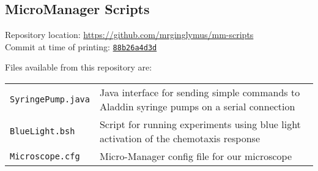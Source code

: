\documentclass[../main.tex]{subfiles}
\begin{document}
\subsection{MicroManager Scripts}
\label{sec:scripts:micromanager}

Repository location: \url{https://github.com/mrginglymus/mm-scripts}\\
Commit at time of printing: \href{https://github.com/mrginglymus/mm-scripts/tree/88b26a4d3db8fb4904cfaae76df14207a233072f}{\texttt{88b26a4d3d}}

Files available from this repository are:

\begin{tabular}{lp{12cm}}
\texttt{SyringePump.java}	&	Java interface for sending simple commands to Aladdin syringe pumps on a serial connection \\
\texttt{BlueLight.bsh}	&	Script for running experiments using blue light activation of the chemotaxis response \\
\texttt{Microscope.cfg}	&	Micro-Manager config file for our microscope
\end{tabular}
\end{document}
